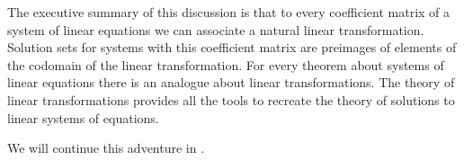 %
The executive summary of this discussion is that to every coefficient matrix of a system of linear equations we can associate a natural linear transformation.  Solution sets for systems with this coefficient matrix are preimages of elements of the codomain of the linear transformation.  For every theorem about systems of linear equations there is an analogue about linear transformations.  The theory of linear transformations provides all the tools to recreate the theory of solutions to linear systems of equations.\par
%
We will continue this adventure in .
%
%
